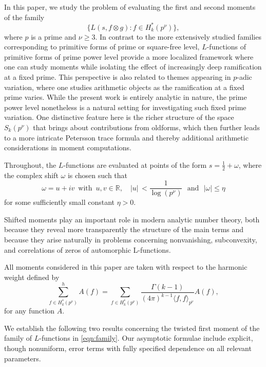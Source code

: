 \documentclass[12pt]{amsart}
\theoremstyle{plain}
\theoremstyle{definition}
\begin{document}
 In this paper, we study the problem of evaluating the first and second moments of the family
\begin{equation}\label{eqn:family}
\{ L(s,f\otimes g):  f\in H_{k}^*(p^\nu) \},
\end{equation}
where $p$ is a prime and $\nu\geq 3$.  In contrast to the more extensively studied families corresponding to primitive forms of prime or square-free level, $L$-functions of primitive forms of prime power level provide a more localized framework where one can study moments while isolating the effect of increasingly deep ramification at a fixed prime. This perspective is also related to themes appearing in $p$-adic variation, where one studies arithmetic objects as the ramification at a fixed prime varies. While the present work is entirely analytic in nature, the prime power level nonetheless is a natural setting for investigating such fixed prime variation. One distinctive feature here is the richer structure of the space $S_k(p^\nu)$ that brings about contributions from oldforms, which then further leads to a more intricate Petersson trace formula and thereby additional arithmetic considerations in moment computations.




Throughout, the $L$-functions are evaluated at points of the form $s=\frac12+\omega$, where the complex shift $\omega$ is chosen such that
\begin{equation}\label{eqn:shift-condition}
\omega=u+iv\, \text{ with }\,  u, v \in \mathbb{R}, \quad
 |u| \, < \frac{1}{\log(p^\nu)}
 \,\, \text{ and } \,\,
 |\omega|\leq \eta
\end{equation}
for some sufficiently small constant \(\eta>0\). 

Shifted moments play an important role in modern analytic number theory, both because they reveal more transparently the structure of the main terms and because they arise naturally in problems concerning nonvanishing, subconvexity, and correlations of zeros of automorphic L-functions.

All moments considered in this paper are taken with respect to the harmonic weight defined by
\[
\sum_{f\in H_k^*(p^\nu)}^{h} A(f)
=
\sum_{f\in H_k^*(p^\nu)}
\frac{\Gamma(k-1)}{(4\pi)^{k-1}\langle f,f\rangle_{p^\nu}}
A(f),
\]
for any function \(A\).


We establish the following two results concerning the twisted first moment of the family of \(L\)-functions in \eqref{eqn:family}. Our asymptotic formulae include explicit, though nonuniform, error terms with fully specified dependence on all relevant parameters.
\end{document}
